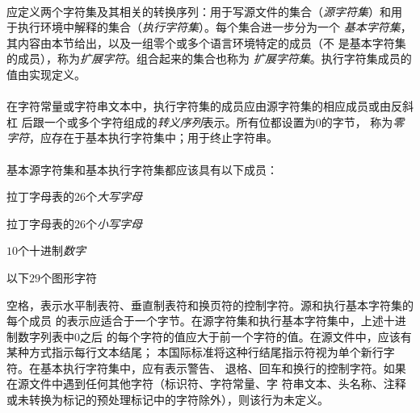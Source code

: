 \paragraph{}
应定义两个字符集及其相关的转换序列：用于写源文件的集合（\textit{源字符集}）和用
于执行环境中解释的集合（\textit{执行字符集}）。每个集合进一步分为一个
\textit{基本字符集}，其内容由本节给出，以及一组零个或多个语言环境特定的成员（不
是基本字符集的成员），称为\textit{扩展字符}。组合起来的集合也称为
\textit{扩展字符集}。执行字符集成员的值由实现定义。

\paragraph{}
在字符常量或字符串文本中，执行字符集的成员应由源字符集的相应成员或由反斜杠
\tm{\bs}后跟一个或多个字符组成的\textit{转义序列}表示。所有位都设置为$0$的字节，
称为\textit{零字符}，应存在于基本执行字符集中；用于终止字符串。

\paragraph{}
基本源字符集和基本执行字符集都应该具有以下成员：

拉丁字母表的$26$个\textit{大写字母}

\mbox{\qquad{}}

\mbox{\qquad{}}

拉丁字母表的$26$个\textit{小写字母}

\mbox{\qquad{}}

\mbox{\qquad{}}

$10$个十进制\textit{数字}

\mbox{\qquad{}}

以下$29$个图形字符

\mbox{\qquad{}}

\mbox{\qquad{}}

空格，表示水平制表符、垂直制表符和换页符的控制字符。源和执行基本字符集的每个成员
的表示应适合于一个字节。在源字符集和执行基本字符集中，上述十进制数字列表中0之后
的每个字符的值应大于前一个字符的值。在源文件中，应该有某种方式指示每行文本结尾；
本国际标准将这种行结尾指示符视为单个新行字符。在基本执行字符集中，应有表示警告、
退格、回车和换行的控制字符。如果在源文件中遇到任何其他字符（标识符、字符常量、字
符串文本、头名称、注释或未转换为标记的预处理标记中的字符除外），则该行为未定义。

